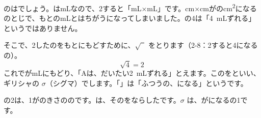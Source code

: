 のはでしょう。はmLなので、2すると「mL×mL」です。cm×cmがの\unit{cm^2}になるのとじで、もとのmLとはちがうになってしまいました。の4は「\qty{4}{mL}ずれる」というではありません。

そこで、2したのをもとにもどすために、$\sqrt{\phantom{2}}$ をとります（2-8：2すると4になるの）。
\[ \sqrt{4}=2 \]
これでがmLにもどり、「Aは、だいたい\qty{2}{mL}ずれる」とえます。このを\textbf{}といい、ギリシャの $\sigma$（シグマ）でします。「」は「ふつうの、になる」というです。

の2は、1がのきさののです。は、そのをならしたです。$\sigma$ は、がになるの1です。

